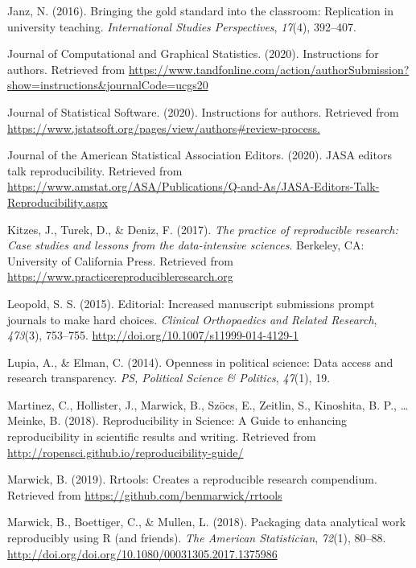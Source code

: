 \documentclass[12pt,twoside]{reedthesis}
\begin{document}
\hypertarget{ref-janz2016bringing}{}
Janz, N. (2016). Bringing the gold standard into the classroom:
Replication in university teaching. \emph{International Studies
Perspectives}, \emph{17}(4), 392--407.

\hypertarget{ref-jcgs-guide}{}
Journal of Computational and Graphical Statistics. (2020). Instructions
for authors. Retrieved from
\url{https://www.tandfonline.com/action/authorSubmission?show=instructions\&journalCode=ucgs20}

\hypertarget{ref-jss-guide}{}
Journal of Statistical Software. (2020). Instructions for authors.
Retrieved from
\url{https://www.jstatsoft.org/pages/view/authors\#review-process.}

\hypertarget{ref-jasa-rep-editors}{}
Journal of the American Statistical Association Editors. (2020). JASA
editors talk reproducibility. Retrieved from
\url{https://www.amstat.org/ASA/Publications/Q-and-As/JASA-Editors-Talk-Reproducibility.aspx}

\hypertarget{ref-kitzes2017practice}{}
Kitzes, J., Turek, D., \& Deniz, F. (2017). \emph{The practice of
reproducible research: Case studies and lessons from the data-intensive
sciences}. Berkeley, CA: University of California Press. Retrieved from
\url{https://www.practicereproducibleresearch.org}

\hypertarget{ref-leopold2015increased}{}
Leopold, S. S. (2015). Editorial: Increased manuscript submissions
prompt journals to make hard choices. \emph{Clinical Orthopaedics and
Related Research}, \emph{473}(3), 753--755.
\url{http://doi.org/10.1007/s11999-014-4129-1}

\hypertarget{ref-lupia2014openness}{}
Lupia, A., \& Elman, C. (2014). Openness in political science: Data
access and research transparency. \emph{PS, Political Science \&
Politics}, \emph{47}(1), 19.

\hypertarget{ref-r-opensci}{}
Martinez, C., Hollister, J., Marwick, B., Szöcs, E., Zeitlin, S.,
Kinoshita, B. P., \ldots{} Meinke, B. (2018). Reproducibility in
Science: A Guide to enhancing reproducibility in scientific results and
writing. Retrieved from
\url{http://ropensci.github.io/reproducibility-guide/}

\hypertarget{ref-R-rrtools}{}
Marwick, B. (2019). Rrtools: Creates a reproducible research compendium.
Retrieved from \url{https://github.com/benmarwick/rrtools}

\hypertarget{ref-marwick2018packaging}{}
Marwick, B., Boettiger, C., \& Mullen, L. (2018). Packaging data
analytical work reproducibly using R (and friends). \emph{The American
Statistician}, \emph{72}(1), 80--88.
\url{http://doi.org/doi.org/10.1080/00031305.2017.1375986}
\end{document}
